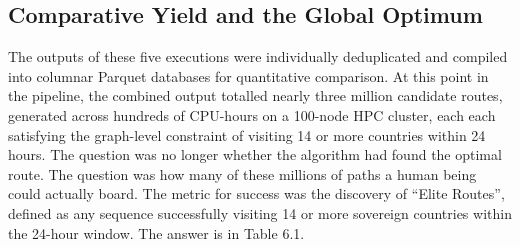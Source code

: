 \subsection{Comparative Yield and the Global Optimum}
\label{subsec:comparative_yield_global_optimum}

The outputs of these five executions were individually deduplicated and compiled into columnar Parquet databases for quantitative comparison. At this point in the pipeline, the combined output totalled nearly three million candidate routes, generated across hundreds of CPU-hours on a 100-node HPC cluster, each each satisfying the graph-level constraint of visiting 14 or more countries within 24 hours. The question was no longer whether the algorithm had found the optimal route. The question was how many of these millions of paths a human being could actually board. The metric for success was the discovery of ``Elite Routes'', defined as any sequence successfully visiting 14 or more sovereign countries within the 24-hour window. The answer is in Table 6.1.


